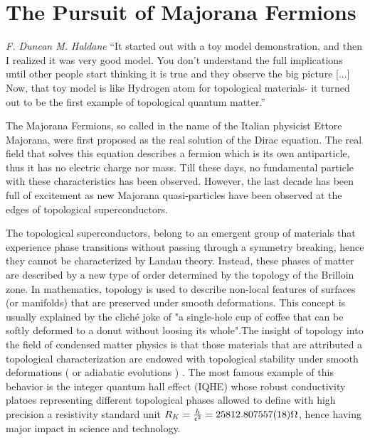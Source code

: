\chapter{The Pursuit of Majorana Fermions \label{chap:Majorana}}

\begin{chapquote}{\textit{F. Duncan M. Haldane}}
``It started out with a toy model demonstration, and then I realized it was very good model.  You don't understand the full implications until other people start thinking it is true and they observe the big picture [...] Now, that toy model is like Hydrogen atom for topological materials- it turned out to be the first example of topological quantum matter.''
\end{chapquote}

The  Majorana Fermions, so called in the name of the Italian physicist Ettore Majorana, were first proposed as the real solution of the Dirac equation. The real field that solves this equation describes a fermion which is its own antiparticle, thus it has no electric charge  nor mass.  Till these days, no fundamental particle with these characteristics has been observed. However, the last decade has been full of excitement as new Majorana quasi-particles have been observed at the edges of topological superconductors.

The topological superconductors, belong to an emergent group of materials that experience phase transitions without passing through a symmetry breaking, hence they cannot be characterized by Landau theory. Instead, these phases of matter are described by  a new type of order determined by the topology of the Brilloin zone. In mathematics, topology is used to describe non-local features of surfaces (or manifolds) that are preserved under smooth deformations. This concept is usually explained by the  clich\'e joke of "a single-hole cup of coffee that can be softly deformed to a donut without loosing its whole".The  insight of topology into  the field of condensed matter physics is that those materials that are attributed a topological characterization are endowed with topological  stability under smooth deformations ( or adiabatic evolutions ) . The most famous example of this behavior is the integer quantum hall effect (IQHE) whose robust conductivity platoes representing different topological phases allowed to define with high precision a resistivity standard unit $ R_K =\frac{h}{\epsilon^2} = 25812.807557(18) \Omega$, hence having major impact in science and technology. 

